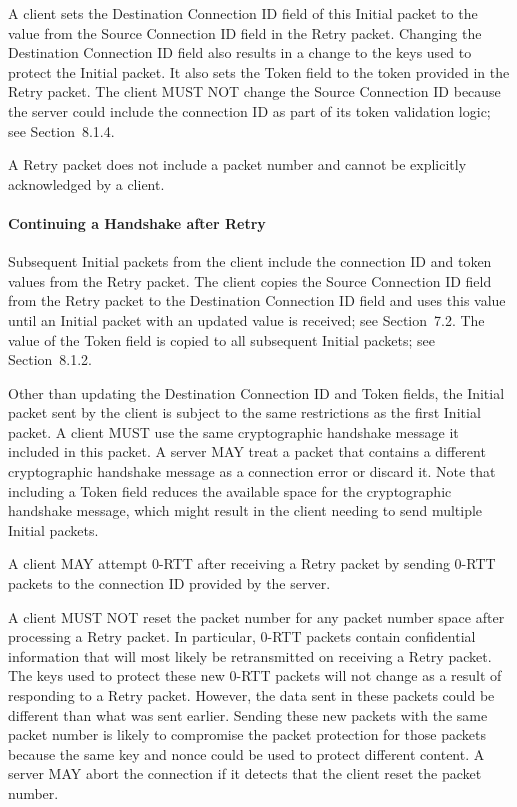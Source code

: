\documentclass{article}
\begin{document}
A client sets the Destination Connection ID field of this Initial packet to the value from the Source Connection ID field in the Retry packet.  Changing the Destination Connection ID field also results in a change to the keys used to protect the Initial packet.  It also sets the Token field to the token provided in the Retry packet.  The client MUST NOT change the Source Connection ID because the server could include the connection ID as part of its token validation logic; see Section~8.1.4.

A Retry packet does not include a packet number and cannot be explicitly acknowledged by a client.

\paragraph{Continuing a Handshake after Retry}

Subsequent Initial packets from the client include the connection ID and token values from the Retry packet.  The client copies the Source Connection ID field from the Retry packet to the Destination Connection ID field and uses this value until an Initial packet with an updated value is received; see Section~7.2.  The value of the Token field is copied to all subsequent Initial packets; see Section~8.1.2.

Other than updating the Destination Connection ID and Token fields, the Initial packet sent by the client is subject to the same restrictions as the first Initial packet.  A client MUST use the same cryptographic handshake message it included in this packet.  A server MAY treat a packet that contains a different cryptographic handshake message as a connection error or discard it.  Note that including a Token field reduces the available space for the cryptographic handshake message, which might result in the client needing to send multiple Initial packets.

A client MAY attempt 0-RTT after receiving a Retry packet by sending 0-RTT packets to the connection ID provided by the server.

A client MUST NOT reset the packet number for any packet number space after processing a Retry packet.  In particular, 0-RTT packets contain confidential information that will most likely be retransmitted on receiving a Retry packet.  The keys used to protect these new 0-RTT packets will not change as a result of responding to a Retry packet.  However, the data sent in these packets could be different than what was sent earlier.  Sending these new packets with the same packet number is likely to compromise the packet protection for those packets because the same key and nonce could be used to protect different content.  A server MAY abort the connection if it detects that the client reset the packet number.
\end{document}
